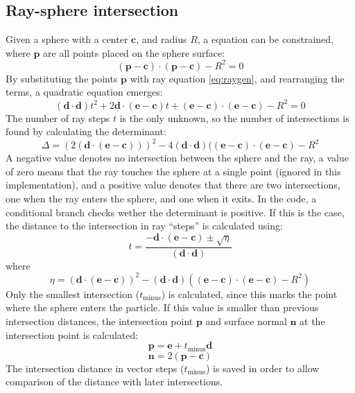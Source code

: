\documentclass[journal]{IEEEtran}
\begin{document}
\subsection{Ray-sphere intersection}
Given a sphere with a center $\mathbf{c}$, and radius $R$, a equation can be constrained, where $\mathbf{p}$ are all points placed on the sphere surface:
\begin{equation}
  (\mathbf{p} - \mathbf{c}) \cdot (\mathbf{p} - \mathbf{c}) - R^2 = 0
  \label{eq:sphere}
\end{equation}
By substituting the points $\mathbf{p}$ with ray equation \ref{eq:raygen}, and rearranging the terms, a quadratic equation emerges:
\begin{equation}
  (\mathbf{d}\cdot\mathbf{d})t^2 + 2\mathbf{d}\cdot(\mathbf{e}-\mathbf{c})t
  + (\mathbf{e}-\mathbf{c})\cdot(\mathbf{e}-\mathbf{c}) - R^2 = 0
  \label{eq:quad}
\end{equation}
The number of ray steps $t$ is the only unknown, so the number of intersections is found by calculating the determinant:
\begin{equation}
  \Delta = (2(\mathbf{d}\cdot(\mathbf{e}-\mathbf{c})))^2 - 4(\mathbf{d}\cdot\mathbf{d}) ( (\mathbf{e}-\mathbf{c})\cdot(\mathbf{e}-\mathbf{c}) - R^2
  \label{eq:Delta}
\end{equation}
A negative value denotes no intersection between the sphere and the ray, a value of zero means that the ray touches the sphere at a single point (ignored in this implementation), and a positive value denotes that there are two intersections, one when the ray enters the sphere, and one when it exits. In the code, a conditional branch checks wether the determinant is positive. If this is the case, the distance to the intersection in ray ``steps'' is calculated using:
\begin{equation}
  t = \frac{-\mathbf{d}\cdot(\mathbf{e}-\mathbf{c}) \pm \sqrt{\eta} } { (\mathbf{d}\cdot\mathbf{d})}
  \label{eq:intersect}
\end{equation}
where
\[ \eta = (\mathbf{d}\cdot(\mathbf{e}-\mathbf{c}))^2 - (\mathbf{d}\cdot\mathbf{d})( (\mathbf{e}-\mathbf{c})\cdot(\mathbf{e}-\mathbf{c}) - R^2) \]
Only the smallest intersection ($t_\text{minus}$) is calculated, since this marks the point where the sphere enters the particle. If this value is smaller than previous intersection distances, the intersection point $\mathbf{p}$ and surface normal $\mathbf{n}$ at the intersection point is calculated:
\begin{equation}
  \mathbf{p} = \mathbf{e} + t_\text{minus} \mathbf{d}
  \label{eq:intersection}
\end{equation}
\begin{equation}
  \mathbf{n} = 2(\mathbf{p}-\mathbf{c})
  \label{eq:normal}
\end{equation}
The intersection distance in vector steps ($t_\text{minus}$) is saved in order to allow comparison of the distance with later intersections. 
\end{document}

